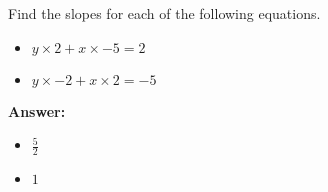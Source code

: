  Find the slopes for each of the following equations. \begin{itemize}\item \( y \times 2 + x \times -5 = 2 \)\item \( y \times -2 + x \times 2 = -5 \)\end{itemize}

        \textbf{Answer:} \begin{itemize}\item \( \frac{5}{2} \)\item \( 1 \)\end{itemize}
